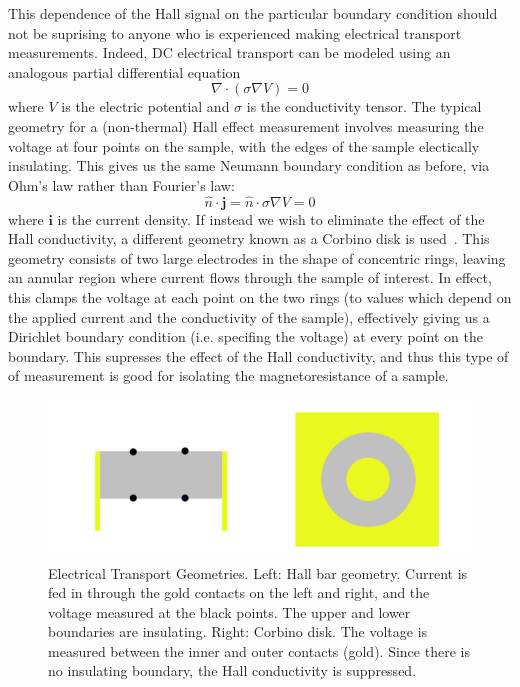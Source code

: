 \documentclass{thesis-umich}
\begin{document}
This dependence of the Hall signal on the particular boundary condition should
not be suprising to anyone who is experienced making electrical transport
measurements. Indeed, DC electrical transport can be modeled using an analogous
partial differential equation \[ \nabla \cdot (\sigma \nabla V) = 0 \] where
$V$ is the electric potential and $\sigma$ is the conductivity tensor. The
typical geometry for a (non-thermal) Hall effect measurement involves measuring
the voltage at four points on the sample, with the edges of the sample
electically insulating. This gives us the same Neumann boundary condition as
before, via Ohm's law rather than Fourier's law: \[ \hat{n} \cdot \mathbf{j} =
\hat{n} \cdot \sigma \nabla V = 0\] where $\mathbf{i}$ is the current density.
If instead we wish to eliminate the effect of the Hall conductivity, a
different geometry known as a Corbino disk is used~\cite{Eo2018}. This geometry consists of
two large electrodes in the shape of concentric rings, leaving an annular
region where current flows through the sample of interest. In effect, this
clamps the voltage at each point on the two rings (to values which depend on
the applied current and the conductivity of the sample), effectively giving us
a Dirichlet boundary condition (i.e. specifing the voltage) at every point on the boundary. This supresses
the effect of the Hall conductivity, and thus this type of of measurement is
good for isolating the magnetoresistance of a sample.

\begin{figure} \centering
	\includegraphics[width=\textwidth]{figures/ehall_geometry.pdf}
	\caption[Electrical Transport Geometries]{Electrical Transport
	Geometries. Left: Hall bar geometry. Current is fed in through the gold
contacts on the left and right, and the voltage measured at the black points.
The upper and lower boundaries are insulating. Right: Corbino disk. The voltage
is measured between the inner and outer contacts (gold). Since there is no
insulating boundary, the Hall conductivity is suppressed.} \end{figure}
\end{document}
